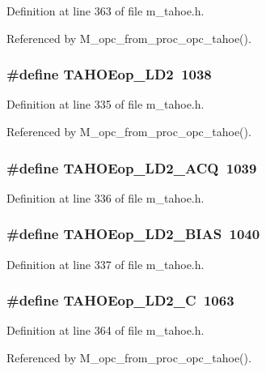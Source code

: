 Definition at line 363 of file m\_\-tahoe.h.

Referenced by M\_\-opc\_\-from\_\-proc\_\-opc\_\-tahoe().
\subsubsection{\setlength{\rightskip}{0pt plus 5cm}\#define TAHOEop\_\-LD2~1038}\label{m__tahoe_8h_6c0a0ef33b4782c30637ccf91aba0825}




Definition at line 335 of file m\_\-tahoe.h.

Referenced by M\_\-opc\_\-from\_\-proc\_\-opc\_\-tahoe().
\subsubsection{\setlength{\rightskip}{0pt plus 5cm}\#define TAHOEop\_\-LD2\_\-ACQ~1039}\label{m__tahoe_8h_2257f3ef1597e2313fd1da069f272211}




Definition at line 336 of file m\_\-tahoe.h.
\subsubsection{\setlength{\rightskip}{0pt plus 5cm}\#define TAHOEop\_\-LD2\_\-BIAS~1040}\label{m__tahoe_8h_8d8bb76414b6a1c8c77c09375645df43}




Definition at line 337 of file m\_\-tahoe.h.
\subsubsection{\setlength{\rightskip}{0pt plus 5cm}\#define TAHOEop\_\-LD2\_\-C~1063}\label{m__tahoe_8h_dff2663129197d59e7dadee472b12ac1}




Definition at line 364 of file m\_\-tahoe.h.

Referenced by M\_\-opc\_\-from\_\-proc\_\-opc\_\-tahoe().
